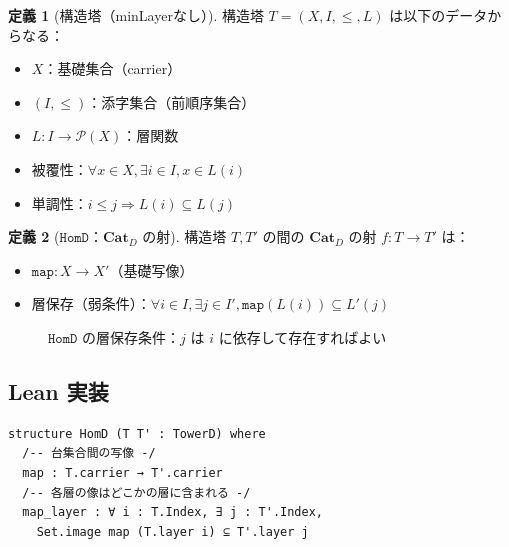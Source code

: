 \documentclass{ltjsarticle}
\theoremstyle{definition}
\newtheorem{definition}{定義}[section]
\newcommand{\catD}{\mathbf{Cat}_D}
\newcommand{\HomD}{\mathtt{HomD}}
\begin{document}
\begin{definition}[構造塔（minLayerなし）]
\label{def:structure-tower}
構造塔 $T = (X, I, \leq, L)$ は以下のデータからなる：
\begin{itemize}
  \item $X$：基礎集合（carrier）
  \item $(I, \leq)$：添字集合（前順序集合）
  \item $L : I \to \mathcal{P}(X)$：層関数
  \item 被覆性：$\forall x \in X, \exists i \in I, x \in L(i)$
  \item 単調性：$i \leq j \Rightarrow L(i) \subseteq L(j)$
\end{itemize}
\end{definition}

\begin{definition}[$\HomD$：$\catD$ の射]
\label{def:hom-d}
構造塔 $T, T'$ の間の $\catD$ の射 $f : T \to T'$ は：
\begin{itemize}
  \item $\mathtt{map} : X \to X'$（基礎写像）
  \item 層保存（弱条件）：$\forall i \in I, \exists j \in I', \mathtt{map}(L(i)) \subseteq L'(j)$
\end{itemize}
\end{definition}

\begin{figure}[htbp]
\centering
{}
\caption{$\HomD$ の層保存条件：$j$ は $i$ に依存して存在すればよい}
\label{fig:hom-d-layer}
\end{figure}

\subsection{Lean 実装}

\begin{lstlisting}[caption=$\HomD$ の Lean 定義（Cat\_D.lean より）]
structure HomD (T T' : TowerD) where
  /-- 台集合間の写像 -/
  map : T.carrier → T'.carrier
  /-- 各層の像はどこかの層に含まれる -/
  map_layer : ∀ i : T.Index, ∃ j : T'.Index,
    Set.image map (T.layer i) ⊆ T'.layer j
\end{lstlisting}
\end{document}
